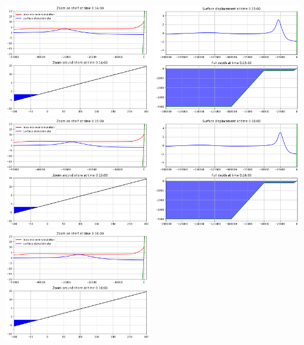 \documentclass[11pt]{article}
\begin{document}
\includegraphics[width=0.475\textwidth]{frame0014fig1.png}
\vskip 10pt 
\includegraphics[width=0.475\textwidth]{frame0015fig0.png}
\includegraphics[width=0.475\textwidth]{frame0015fig1.png}
\vskip 10pt 
\includegraphics[width=0.475\textwidth]{frame0016fig0.png}
\includegraphics[width=0.475\textwidth]{frame0016fig1.png}
\end{document}
